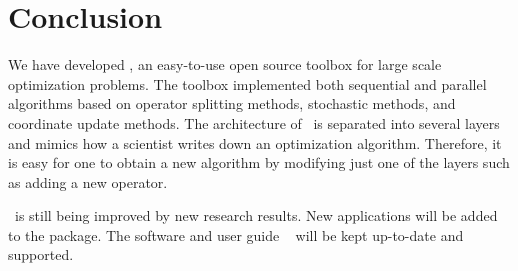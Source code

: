 \section{Conclusion}
We have developed \pkg, an easy-to-use open source toolbox for large scale optimization problems.
The toolbox implemented both sequential and parallel algorithms based on operator splitting methods, stochastic methods,
and coordinate update methods. The architecture of \pkg~is separated into several layers and mimics how a scientist writes down an optimization algorithm. Therefore, it is easy for one to obtain a new algorithm by modifying just one of the layers such as adding a new operator.

\pkg~is still being improved by new research results. New applications will be added to the package. The software and user guide \repo~ will be kept up-to-date and supported.